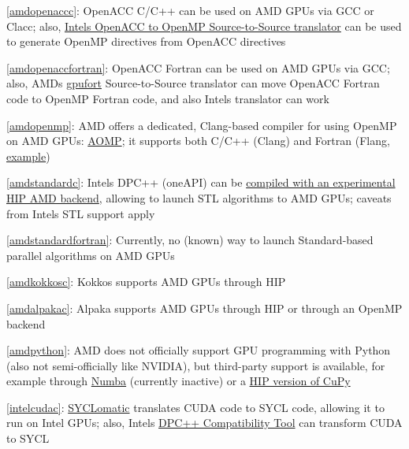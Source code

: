 \item \ref{amdopenaccc}: OpenACC C/C++ can be used on AMD GPUs via GCC or Clacc; also, \href{https://github.com/intel/intel-application-migration-tool-for-openacc-to-openmp}{Intel\textquotesingle s OpenACC to OpenMP Source-to-Source translator} can be used to generate OpenMP directives from OpenACC directives
\item \ref{amdopenaccfortran}: OpenACC Fortran can be used on AMD GPUs via GCC; also, AMD\textquotesingle s \href{https://github.com/intel/intel-application-migration-tool-for-openacc-to-openmp}{gpufort} Source-to-Source translator can move OpenACC Fortran code to OpenMP Fortran code, and also Intel\textquotesingle s translator can work
\item \ref{amdopenmp}: AMD offers a dedicated, Clang-based compiler for using OpenMP on AMD GPUs: \href{https://github.com/ROCm-Developer-Tools/aomp}{AOMP}; it supports both C/C++ (Clang) and Fortran (Flang, \href{https://github.com/ROCm-Developer-Tools/aomp/tree/aomp-dev/examples/fortran/simple_offload}{example})
\item \ref{amdstandardc}: Intel\textquotesingle s DPC++ (oneAPI) can be \href{https://intel.github.io/llvm-docs/GetStartedGuide.html\#build-dpc-toolchain-with-support-for-hip-amd}{compiled with an experimental HIP AMD backend}, allowing to launch STL algorithms to AMD GPUs; caveats from Intel\textquotesingle s STL support apply
\item \ref{amdstandardfortran}: Currently, no (known) way to launch Standard-based parallel algorithms on AMD GPUs
\item \ref{amdkokkosc}: Kokkos supports AMD GPUs through HIP
\item \ref{amdalpakac}: Alpaka supports AMD GPUs through HIP or through an OpenMP backend
\item \ref{amdpython}: AMD does not officially support GPU programming with Python (also not semi-officially like NVIDIA), but third-party support is available, for example through \href{https://numba.pydata.org/numba-doc/latest/roc/index.html}{Numba} (currently inactive) or a \href{https://docs.cupy.dev/en/latest/install.html?highlight=rocm\#building-cupy-for-rocm-from-source}{HIP version of CuPy}
\item \ref{intelcudac}: \href{https://github.com/oneapi-src/SYCLomatic}{SYCLomatic} translates CUDA code to SYCL code, allowing it to run on Intel GPUs; also, Intel\textquotesingle s \href{https://www.intel.com/content/www/us/en/developer/tools/oneapi/dpc-compatibility-tool.html}{DPC++ Compatibility Tool} can transform CUDA to SYCL
